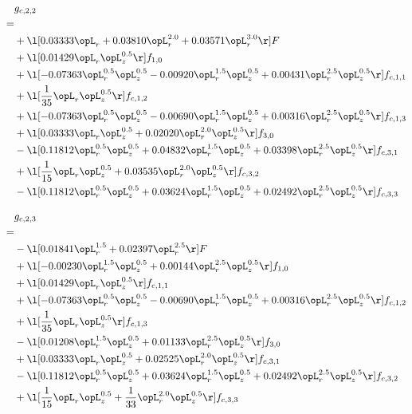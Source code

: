 \begin{alignat}{2} 
\label{eq:g_22_0} 
& g_{c,2,2} \nonumber \\ 
 = \\ 
& + \l[  0.03333 \opL_r +  0.03810 \opL_r^{2.0} +  0.03571 \opL_r^{3.0}  \r] F \nonumber \\ 
& + \l[  0.01429 \opL_r \opL_z^{0.5}  \r] f_{1,0} \nonumber \\ 
& + \l[  -0.07363 \opL_r^{0.5} \opL_z^{0.5}   -0.00920 \opL_r^{1.5} \opL_z^{0.5} +  0.00431 \opL_r^{2.5} \opL_z^{0.5}  \r] f_{c,1,1} \nonumber \\ 
& + \l[ \frac{1}{35} \opL_r \opL_z^{0.5}  \r] f_{c,1,2} \nonumber \\ 
& + \l[  -0.07363 \opL_r^{0.5} \opL_z^{0.5}   -0.00690 \opL_r^{1.5} \opL_z^{0.5} +  0.00316 \opL_r^{2.5} \opL_z^{0.5}  \r] f_{c,1,3} \nonumber \\ 
& + \l[  0.03333 \opL_r \opL_z^{0.5} +  0.02020 \opL_r^{2.0} \opL_z^{0.5}  \r] f_{3,0} \nonumber \\ 
& - \l[  0.11812 \opL_r^{0.5} \opL_z^{0.5} +  0.04832 \opL_r^{1.5} \opL_z^{0.5} +  0.03398 \opL_r^{2.5} \opL_z^{0.5}  \r] f_{c,3,1} \nonumber \\ 
& + \l[ \frac{1}{15} \opL_r \opL_z^{0.5} +  0.03535 \opL_r^{2.0} \opL_z^{0.5}  \r] f_{c,3,2} \nonumber \\ 
& - \l[  0.11812 \opL_r^{0.5} \opL_z^{0.5} +  0.03624 \opL_r^{1.5} \opL_z^{0.5} +  0.02492 \opL_r^{2.5} \opL_z^{0.5}  \r] f_{c,3,3} \nonumber \\ 
\end{alignat} 


\begin{alignat}{2} 
\label{eq:g_23_0} 
& g_{c,2,3} \nonumber \\ 
 = \\ 
& - \l[  0.01841 \opL_r^{1.5} +  0.02397 \opL_r^{2.5}  \r] F \nonumber \\ 
& + \l[  -0.00230 \opL_r^{1.5} \opL_z^{0.5} +  0.00144 \opL_r^{2.5} \opL_z^{0.5}  \r] f_{1,0} \nonumber \\ 
& + \l[  0.01429 \opL_r \opL_z^{0.5}  \r] f_{c,1,1} \nonumber \\ 
& + \l[  -0.07363 \opL_r^{0.5} \opL_z^{0.5}   -0.00690 \opL_r^{1.5} \opL_z^{0.5} +  0.00316 \opL_r^{2.5} \opL_z^{0.5}  \r] f_{c,1,2} \nonumber \\ 
& + \l[ \frac{1}{35} \opL_r \opL_z^{0.5}  \r] f_{c,1,3} \nonumber \\ 
& - \l[  0.01208 \opL_r^{1.5} \opL_z^{0.5} +  0.01133 \opL_r^{2.5} \opL_z^{0.5}  \r] f_{3,0} \nonumber \\ 
& + \l[  0.03333 \opL_r \opL_z^{0.5} +  0.02525 \opL_r^{2.0} \opL_z^{0.5}  \r] f_{c,3,1} \nonumber \\ 
& - \l[  0.11812 \opL_r^{0.5} \opL_z^{0.5} +  0.03624 \opL_r^{1.5} \opL_z^{0.5} +  0.02492 \opL_r^{2.5} \opL_z^{0.5}  \r] f_{c,3,2} \nonumber \\ 
& + \l[ \frac{1}{15} \opL_r \opL_z^{0.5} + \frac{1}{33} \opL_r^{2.0} \opL_z^{0.5}  \r] f_{c,3,3} \nonumber \\ 
\end{alignat} 


